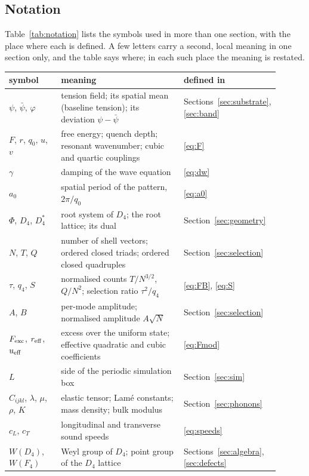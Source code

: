 \documentclass[a4paper,11pt]{article}
\let\jsOldToprule\toprule
\renewcommand{\toprule}{\jsOldToprule\rowcolor{bgheader}}
\numberwithin{equation}{section}
\theoremstyle{jsplain}
\theoremstyle{jsrem}
\begin{document}
\subsection{Notation}\label{sec:notation}

Table~\ref{tab:notation} lists the symbols used in more than one section, with the place where each is defined. A few letters carry a second, local meaning in one section only, and the table says where; in each such place the meaning is restated.

\begin{table}[htbp]
\centering
\small
\begin{tabular}{p{0.2\linewidth}p{0.5\linewidth}p{0.2\linewidth}}
\toprule
symbol & meaning & defined in\\
\midrule
$\psi$, $\bar\psi$, $\varphi$ & tension field; its spatial mean (baseline tension); its deviation $\psi-\bar\psi$ & Sections~\ref{sec:substrate}, \ref{sec:band}\\
$F$, $r$, $q_0$, $u$, $v$ & free energy; quench depth; resonant wavenumber; cubic and quartic couplings & \eqref{eq:F}\\
$\gamma$ & damping of the wave equation & \eqref{eq:dw}\\
$a_0$ & spatial period of the pattern, $2\pi/q_0$ & \eqref{eq:a0}\\
$\Phi$, $D_4$, $D_4^*$ & root system of $D_4$; the root lattice; its dual & Section~\ref{sec:geometry}\\
$N$, $T$, $Q$ & number of shell vectors; ordered closed triads; ordered closed quadruples & Section~\ref{sec:selection}\\
$\tau$, $q_4$, $S$ & normalised counts $T/N^{3/2}$, $Q/N^2$; selection ratio $\tau^2/q_4$ & \eqref{eq:FB}, \eqref{eq:S}\\
$A$, $B$ & per-mode amplitude; normalised amplitude $A\sqrt N$ & Section~\ref{sec:selection}\\
$F_{\rm exc}$, $r_{\rm eff}$, $u_{\rm eff}$ & excess over the uniform state; effective quadratic and cubic coefficients & \eqref{eq:Fmod}\\
$L$ & side of the periodic simulation box & Section~\ref{sec:sim}\\
$C_{ijkl}$, $\lambda$, $\mu$, $\rho$, $K$ & elastic tensor; Lamé constants; mass density; bulk modulus & Section~\ref{sec:phonons}\\
$c_L$, $c_T$ & longitudinal and transverse sound speeds & \eqref{eq:speeds}\\
$W(D_4)$, $W(F_4)$ & Weyl group of $D_4$; point group of the $D_4$ lattice & Sections~\ref{sec:algebra}, \ref{sec:defects}\\

\end{tabular}
\end{table}
\end{document}
